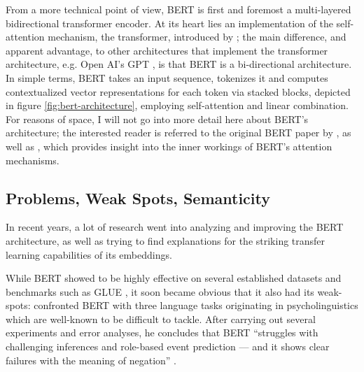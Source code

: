 From a more technical point of view, BERT is first and foremost a multi-layered bidirectional
transformer encoder. At its heart lies an implementation of the self-attention mechanism, the
transformer, introduced by \cite{vaswani2017attention}; the main difference, and apparent
advantage, to other architectures that implement the transformer architecture, e.g. Open AI's GPT
\citep{radford2018improving}, is that BERT is a bi-directional architecture. In simple terms,
BERT takes an input sequence, tokenizes it and computes contextualized vector representations
for each token via stacked blocks, depicted in figure \ref{fig:bert-architecture}, employing
self-attention and linear combination. For reasons of space, I will not go into more detail
here about BERT's architecture; the interested reader is referred to the original BERT paper by
\cite{devlin2018bert}, as well as \cite{clark2019does}, which provides insight into the inner
workings of BERT's attention mechanisms.






\subsection{Problems, Weak Spots, Semanticity}
\label{sec:problems}

In recent years, a lot of research went into analyzing and improving the BERT architecture, as well
as trying to find explanations for the striking transfer learning capabilities of its  embeddings.

While BERT showed to be highly effective on several established datasets and
benchmarks such as GLUE \citep{wang2018glue}, it soon became obvious that it
also had its weak-spots: \citeauthor{ettinger2020bert} confronted BERT with
three language tasks originating in psycholinguistics which are well-known
to be difficult to tackle. After carrying out several experiments and error
analyses, he concludes that BERT ``struggles with challenging inferences and
role-based event prediction --- and it shows clear failures with the meaning
of negation'' \citep[p.~46]{ettinger2020bert}.

